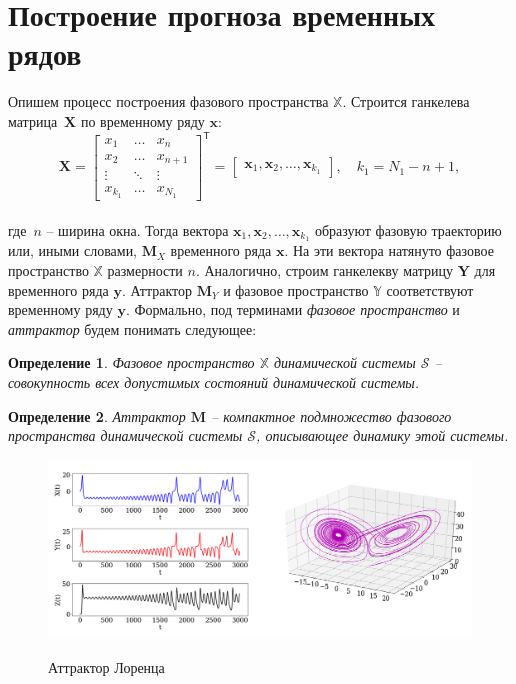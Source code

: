 \documentclass[12pt]{extarticle}
\newcommand{\bx}{\mathbf{x}}
\newcommand{\by}{\mathbf{y}}
\newcommand{\bM}{\mathbf{M}}
\newcommand{\bX}{\mathbf{X}}
\newcommand{\bY}{\mathbf{Y}}
\newtheorem{definition}{Определение}
\begin{document}
\section{Построение прогноза временных рядов}
   Опишем процесс построения фазового пространства $\mathbb{X}$.
   Строится ганкелева матрица~$\bX$ по временному ряду $\bx$:
     \begin{equation}
         \bX = \begin{bmatrix}
                        x_1 & \dots & x_{n} \\
                        x_2 & \dots & x_{n+1} \\
                        \vdots  &\ddots& \vdots \\
                        x_{k_1} & \dots & x_{N_1}
                    \end{bmatrix}^{\mathsf{T}} = 
                    \begin{bmatrix}
                        \bx_1,
                        \bx_2, 
                        \dots,
                        \bx_{k_1}
                    \end{bmatrix}, \quad k_1 = N_1 - n + 1,
                    \label{tr_matrix}
                    \end{equation}\\
где~$n$ -- ширина окна. Тогда вектора $\bx_1, \bx_2, \dots, \bx_{k_1}$ образуют фазовую траекторию или, иными словами,  $\mathbf{M}_X$ временного ряда $\bx$. На эти вектора натянуто фазовое пространство $\mathbb{X}$ размерности $n$. Аналогично, строим ганкелекву матрицу $\bY$ для временного ряда $\by$. Аттрактор $\bM_Y$ и фазовое пространство $\mathbb{Y}$ соответствуют временному ряду $\by$. Формально, под терминами \emph{фазовое пространство} и \emph{аттрактор} будем понимать следующее:

\begin{definition}
Фазовое пространство $\mathbb{X}$ динамической системы $\mathcal{S}$ -- совокупность всех допустимых состояний динамической системы.
\end{definition}


\begin{definition}
Аттрактор $\mathbf{M}$ -- компактное подмножество фазового пространства динамической системы $\mathcal{S}$, описывающее динамику этой системы. 
\end{definition}

\begin{figure}[ht]
\centering
{\includegraphics[width=1\textwidth]{./images/ts_xyz.png}}
\caption{Аттрактор Лоренца}
\label{fg:attractor}
\end{figure}
\end{document}
